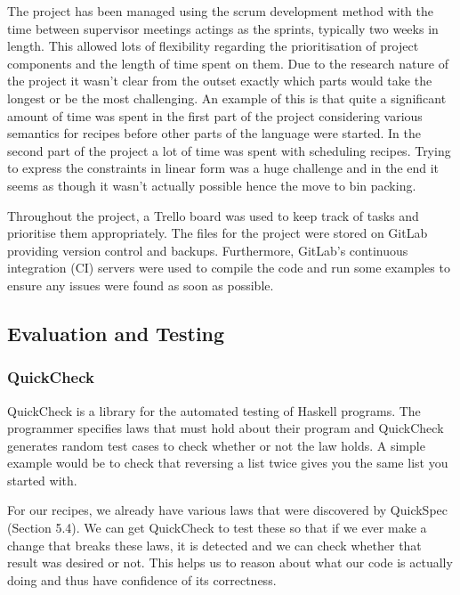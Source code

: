 \documentclass[11pt]{article}
\begin{document}
The project has been managed using the scrum development method with the time
between supervisor meetings actings as the sprints, typically two weeks in length.
This allowed lots of flexibility regarding the prioritisation of project
components and the length of time spent on them. Due to the research nature
of the project it wasn't clear from the outset exactly which parts would take the
longest or be the most challenging. An example of this is that
quite a significant amount of time was spent in the first part of the project
considering various semantics for recipes before other parts of the language
were started. In the second part of the project a lot of time was spent
with scheduling recipes. Trying to express the constraints in linear form
was a huge challenge and in the end it seems as though it wasn't actually possible
hence the move to bin packing.

\medbreak

Throughout the project, a Trello board was used to keep track of tasks
and prioritise them appropriately. The files for the project were stored
on GitLab providing version control and backups. Furthermore, GitLab's
continuous integration (CI) servers were used to compile the code and run
some examples to ensure any issues were found as soon as possible.

\subsection{Evaluation and Testing}

\subsubsection{QuickCheck}

QuickCheck \cite{quickcheck} is a library for the automated testing of Haskell
programs. The programmer specifies laws that must hold about their program
and QuickCheck generates random test cases to check whether or not the
law holds. A simple example would be to check that reversing a list
twice gives you the same list you started with.

\medbreak

For our recipes, we already have various laws that were discovered by QuickSpec
(Section 5.4). We can get QuickCheck to test these so that if we ever make
a change that breaks these laws, it is detected and we can check whether that
result was desired or not. This helps us to reason about what our code is actually
doing and thus have confidence of its correctness.
\end{document}
